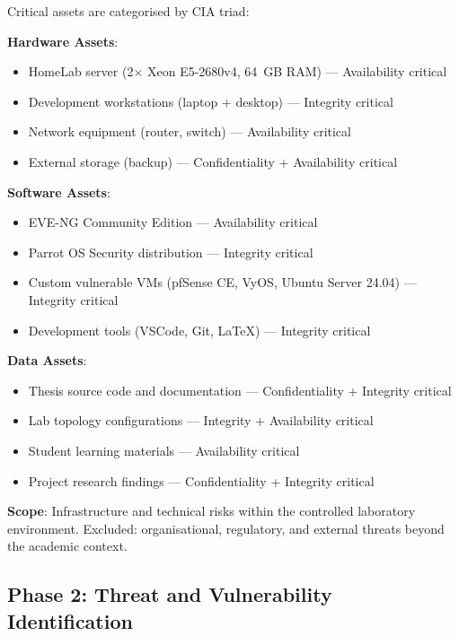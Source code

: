 Critical assets are categorised by CIA triad:

\textbf{Hardware Assets}:
\begin{itemize}
\item HomeLab server (2$\times$ Xeon E5-2680v4, 64~GB RAM) --- Availability critical
\item Development workstations (laptop + desktop) --- Integrity critical
\item Network equipment (router, switch) --- Availability critical
\item External storage (backup) --- Confidentiality + Availability critical
\end{itemize}

\textbf{Software Assets}:
\begin{itemize}
\item EVE-NG Community Edition --- Availability critical
\item Parrot OS Security distribution --- Integrity critical
\item Custom vulnerable VMs (pfSense CE, VyOS, Ubuntu Server 24.04) --- Integrity critical
\item Development tools (VSCode, Git, LaTeX) --- Integrity critical
\end{itemize}

\textbf{Data Assets}:
\begin{itemize}
\item Thesis source code and documentation --- Confidentiality + Integrity critical
\item Lab topology configurations --- Integrity + Availability critical
\item Student learning materials --- Availability critical
\item Project research findings --- Confidentiality + Integrity critical
\end{itemize}

\textbf{Scope}: Infrastructure and technical risks within the controlled laboratory
environment. Excluded: organisational, regulatory, and external threats beyond the
academic context.

\subsection{Phase 2: Threat and Vulnerability Identification}


